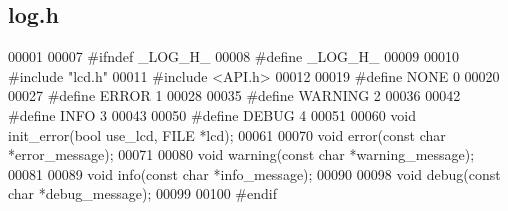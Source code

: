 \subsection{log.\+h}
\label{a00035_source}

\begin{DoxyCode}
00001 
00007 \textcolor{preprocessor}{#ifndef \_LOG\_H\_}
00008 \textcolor{preprocessor}{#define \_LOG\_H\_}
00009 
00010 \textcolor{preprocessor}{#include "lcd.h"}
00011 \textcolor{preprocessor}{#include <API.h>}
00012 
00019 \textcolor{preprocessor}{#define NONE 0}
00020 
00027 \textcolor{preprocessor}{#define ERROR 1}
00028 
00035 \textcolor{preprocessor}{#define WARNING 2}
00036 
00042 \textcolor{preprocessor}{#define INFO 3}
00043 
00050 \textcolor{preprocessor}{#define DEBUG 4}
00051 
00060 \textcolor{keywordtype}{void} init_error(\textcolor{keywordtype}{bool} use\_lcd, FILE *lcd);
00061 
00070 \textcolor{keywordtype}{void} error(\textcolor{keyword}{const} \textcolor{keywordtype}{char} *error\_message);
00071 
00080 \textcolor{keywordtype}{void} warning(\textcolor{keyword}{const} \textcolor{keywordtype}{char} *warning\_message);
00081 
00089 \textcolor{keywordtype}{void} info(\textcolor{keyword}{const} \textcolor{keywordtype}{char} *info\_message);
00090 
00098 \textcolor{keywordtype}{void} debug(\textcolor{keyword}{const} \textcolor{keywordtype}{char} *debug\_message);
00099 
00100 \textcolor{preprocessor}{#endif}
\end{DoxyCode}
